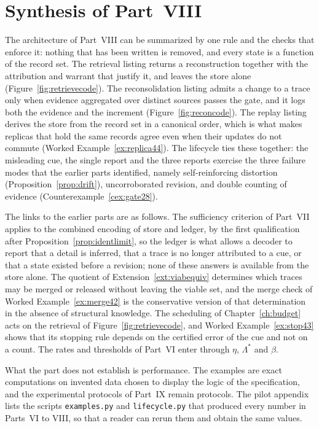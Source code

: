 \section*{Synthesis of Part~VIII}\label{sec:synth8}

The architecture of Part~VIII can be summarized by one rule and the checks that enforce it: nothing that has been written is removed, and every state is a function of the record set. The retrieval listing returns a reconstruction together with the attribution and warrant that justify it, and leaves the store alone (Figure~\ref{fig:retrievecode}). The reconsolidation listing admits a change to a trace only when evidence aggregated over distinct sources passes the gate, and it logs both the evidence and the increment (Figure~\ref{fig:reconcode}). The replay listing derives the store from the record set in a canonical order, which is what makes replicas that hold the same records agree even when their updates do not commute (Worked Example~\ref{ex:replica44}). The lifecycle ties these together: the misleading cue, the single report and the three reports exercise the three failure modes that the earlier parts identified, namely self-reinforcing distortion (Proposition~\ref{prop:drift}), uncorroborated revision, and double counting of evidence (Counterexample~\ref{cex:gate28}).

The links to the earlier parts are as follows. The sufficiency criterion of Part~VII applies to the combined encoding of store and ledger, by the first qualification after Proposition~\ref{prop:identlimit}, so the ledger is what allows a decoder to report that a detail is inferred, that a trace is no longer attributed to a cue, or that a state existed before a revision; none of these answers is available from the store alone. The quotient of Extension~\ref{ext:viabequiv} determines which traces may be merged or released without leaving the viable set, and the merge check of Worked Example~\ref{ex:merge42} is the conservative version of that determination in the absence of structural knowledge. The scheduling of Chapter~\ref{ch:budget} acts on the retrieval of Figure~\ref{fig:retrievecode}, and Worked Example~\ref{ex:stop43} shows that its stopping rule depends on the certified error of the cue and not on a count. The rates and thresholds of Part~VI enter through $\eta$, $\Lambda^\ast$ and $\beta$.

What the part does not establish is performance. The examples are exact computations on invented data chosen to display the logic of the specification, and the experimental protocols of Part~IX remain protocols. The pilot appendix lists the scripts \texttt{examples.py} and \texttt{lifecycle.py} that produced every number in Parts~VI to VIII, so that a reader can rerun them and obtain the same values.
